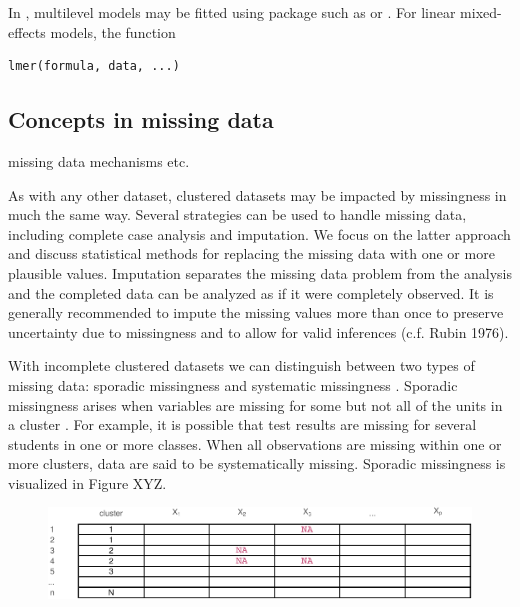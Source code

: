 \documentclass[
  article]{jss}
\begin{document}
In , multilevel models may be fitted using package such as
 or . For linear mixed-effects models, the function

\begin{verbatim}
lmer(formula, data, ...)
\end{verbatim}

\hypertarget{concepts-in-missing-data}{%
\subsection{Concepts in missing data}\label{concepts-in-missing-data}}

missing data mechanisms etc.

As with any other dataset, clustered datasets may be impacted by
missingness in much the same way. Several strategies can be used to
handle missing data, including complete case analysis and imputation. We
focus on the latter approach and discuss statistical methods for
replacing the missing data with one or more plausible values. Imputation
separates the missing data problem from the analysis and the completed
data can be analyzed as if it were completely observed. It is generally
recommended to impute the missing values more than once to preserve
uncertainty due to missingness and to allow for valid inferences (c.f.
Rubin 1976).

With incomplete clustered datasets we can distinguish between two types
of missing data: sporadic missingness and systematic missingness
\citep{resc13}. Sporadic missingness arises when variables are missing
for some but not all of the units in a cluster \citep{buur18, jola18}.
For example, it is possible that test results are missing for several
students in one or more classes. When all observations are missing
within one or more clusters, data are said to be systematically missing.
Sporadic missingness is visualized in Figure XYZ.

\begin{figure}[h]

{\centering \includegraphics{manuscript_files/figure-pdf/unnamed-chunk-2-1.pdf}

}

\end{figure}
\end{document}
